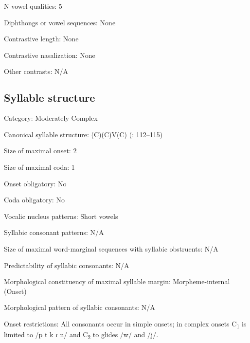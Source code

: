 {\begin{appendixdesc}
\item[N vowel qualities:] 5

\item[Diphthongs or vowel sequences:] None

\item[Contrastive length:] None

\item[Contrastive nasalization:] None

\item[Other contrasts:] N/A
\end{appendixdesc}
\subsection*{Syllable structure}
\begin{appendixdesc}

\item[Category:] Moderately Complex

\item[Canonical syllable structure:] (C)(C)V(C) (\citealt{VallejosYopán2010}: 112--115)

\item[Size of maximal onset:] 2

\item[Size of maximal coda:] 1

\item[Onset obligatory:] No

\item[Coda obligatory:] No

\item[Vocalic nucleus patterns:] Short vowels

\item[Syllabic consonant patterns:] N/A

\item[Size of maximal word-marginal sequences with syllabic obstruents:] N/A

\item[Predictability of syllabic consonants:] N/A

\item[Morphological constituency of maximal syllable margin:] Morpheme-internal (Onset)

\item[Morphological pattern of syllabic consonants:] N/A

\item[Onset restrictions:] All consonants occur in simple onsets; in complex onsets C\textsubscript{1} is limited to /p t k ɾ n/ and C\textsubscript{2} to glides /w/ and /j/.


\end{appendixdesc}}
